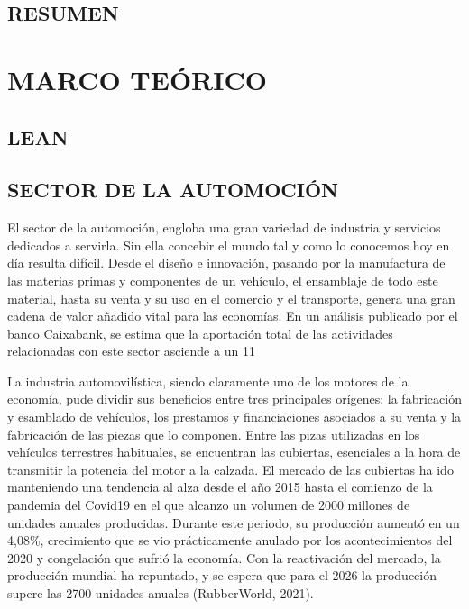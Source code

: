 \subsection{RESUMEN}

\section{MARCO TEÓRICO}
\subsection{LEAN}
\subsection{SECTOR DE LA AUTOMOCIÓN}

El sector de la automoción, engloba una gran variedad de industria y servicios dedicados a servirla. Sin ella concebir el mundo tal y como lo conocemos hoy en día resulta difícil. Desde el diseño e innovación, pasando por la manufactura de las materias primas y componentes de un vehículo, el ensamblaje de todo este material, hasta su venta y su uso en el comercio y el transporte, genera una gran cadena de valor añadido vital para las economías. En un análisis publicado por el banco Caixabank, se estima que la aportación total de las actividades relacionadas con este sector asciende a un 11%
 
La industria automovilística, siendo claramente uno de los motores de la economía, pude dividir sus beneficios entre tres principales orígenes: la fabricación y esamblado de vehículos, los prestamos y financiaciones asociados a su venta y la fabricación de las piezas que lo componen. Entre las pizas utilizadas en los vehículos terrestres habituales, se encuentran las cubiertas, esenciales a la hora de transmitir la potencia del motor a la calzada. El mercado de las cubiertas ha ido manteniendo una tendencia al alza desde el año 2015 hasta el comienzo de la pandemia del Covid19 en el que alcanzo un volumen de 2000 millones de unidades anuales producidas. Durante este periodo, su producción aumentó en un 4,08\%, crecimiento que se vio prácticamente anulado por los acontecimientos del 2020 y congelación que sufrió la economía. Con la reactivación del mercado, la producción mundial ha repuntado, y se espera que para el 2026 la producción supere las 2700 unidades anuales (RubberWorld, 2021).

